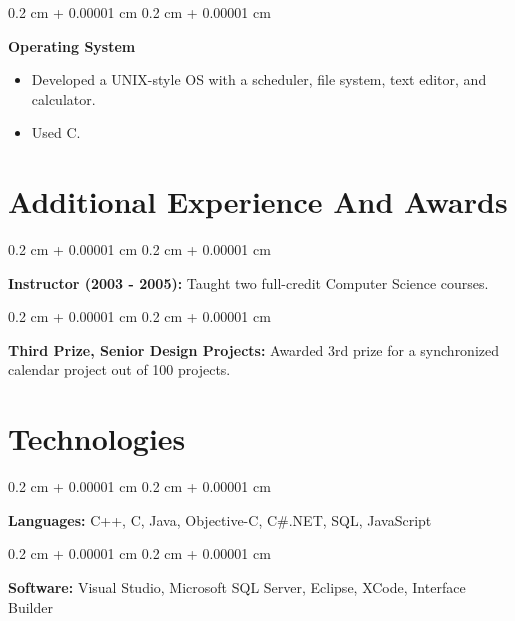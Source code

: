 \documentclass[10pt, letterpaper]{article}
\newenvironment{highlights}{
    \begin{itemize}[
        topsep=0.10 cm,
        parsep=0.10 cm,
        partopsep=0pt,
        itemsep=0pt,
        leftmargin=0.4 cm + 10pt
    ]
    }{
    \end{itemize}
} %
\newenvironment{onecolentry}{
    \begin{adjustwidth}{
        0.2 cm + 0.00001 cm
    }{
        0.2 cm + 0.00001 cm
    }
    }{
    \end{adjustwidth}
} %
\newenvironment{twocolentry}[2][]{
    \onecolentry
    \def\secondColumn{#2}
    \setcolumnwidth{\fill, 4.5 cm}
    \begin{paracol}{2}
    }{
        \switchcolumn \raggedleft \secondColumn
    \end{paracol}
    \endonecolentry
} %
\begin{document}
    \vspace{0.2 cm}

    \begin{twocolentry}{
        2002
    }
        \textbf{Operating System}
        \begin{highlights}
            \item Developed a UNIX-style OS with a scheduler, file system, text editor, and calculator.
            \item Used C.
        \end{highlights}
    \end{twocolentry}




    \section{Additional Experience And Awards}




    \begin{onecolentry}
        \textbf{Instructor (2003 - 2005):} Taught two full-credit Computer Science courses.
    \end{onecolentry}

    \vspace{0.2 cm}

    \begin{onecolentry}
        \textbf{Third Prize, Senior Design Projects:} Awarded 3rd prize for a synchronized calendar project out of 100 projects.
    \end{onecolentry}



    \section{Technologies}




    \begin{onecolentry}
        \textbf{Languages:} C++, C, Java, Objective-C, C\#.NET, SQL, JavaScript
    \end{onecolentry}

    \vspace{0.2 cm}

    \begin{onecolentry}
        \textbf{Software:} Visual Studio, Microsoft SQL Server, Eclipse, XCode, Interface Builder
    \end{onecolentry}
\end{document}
